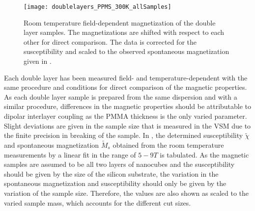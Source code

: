 \documentclass[\main/dresen_thesis.tex]{subfiles}
\begin{document}
  \label{sec:doubleLayers:vsm}

  \begin{figure}[tb]
    \centering
    \texttt{[image: doublelayers\_PPMS\_300K\_allSamples]}
    \caption{\label{fig:doubleLayers:RTVSM}Room temperature field-dependent magnetization of the double layer samples. The magnetizations are shifted with respect to each other for direct comparison. The data is corrected for the susceptibility and scaled to the observed spontaneous magnetization given in .}
  \end{figure}

    Each double layer has been measured field- and temperature-dependent with the same procedure and conditions for direct comparison of the magnetic properties.
    As each double layer sample is prepared from the same dispersion and with a similar procedure, differences in the magnetic properties should be attributable to dipolar interlayer coupling as the PMMA thickness is the only varied parameter.
    Slight deviations are given in the sample size that is measured in the VSM due to the finite precision in breaking of the sample.
    In , the determined susceptibility $\tilde{\chi}$ and spontaneous magnetization $\tilde{M}_s$ obtained from the room temperature measurements by a linear fit in the range of $5 - 9 \unit{T}$ is tabulated.
    As the magnetic samples are assumed to be all two layers of nanocubes and the susceptibility should be given by the size of the silicon substrate, the variation in the spontaneous magnetization and susceptibility should only be given by the variation of the sample size.
    Therefore, the values are also shown as scaled to the varied sample mass, which accounts for the different cut sizes.
\end{document}
